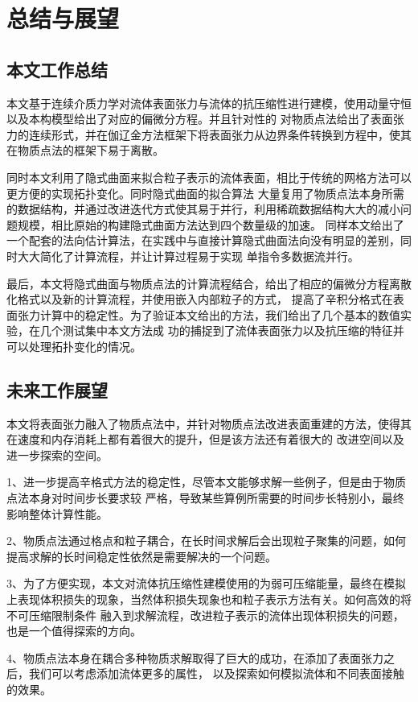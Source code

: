 \chapter{总结与展望}
\section{本文工作总结}
本文基于连续介质力学对流体表面张力与流体的抗压缩性进行建模，使用动量守恒以及本构模型给出了对应的偏微分方程。并且针对性的
对物质点法给出了表面张力的连续形式，并在伽辽金方法框架下将表面张力从边界条件转换到方程中，使其在物质点法的框架下易于离散。

同时本文利用了隐式曲面来拟合粒子表示的流体表面，相比于传统的网格方法可以更方便的实现拓扑变化。同时隐式曲面的拟合算法
大量复用了物质点法本身所需的数据结构，并通过改进迭代方式使其易于并行，利用稀疏数据结构大大的减小问题规模，相比原始的构建隐式曲面方法达到四个数量级的加速。
同样本文给出了一个配套的法向估计算法，在实践中与直接计算隐式曲面法向没有明显的差别，同时大大简化了计算流程，并让计算过程易于实现
单指令多数据流并行。

最后，本文将隐式曲面与物质点法的计算流程结合，给出了相应的偏微分方程离散化格式以及新的计算流程，并使用嵌入内部粒子的方式，
提高了辛积分格式在表面张力计算中的稳定性。为了验证本文给出的方法，我们给出了几个基本的数值实验，在几个测试集中本文方法成
功的捕捉到了流体表面张力以及抗压缩的特征并可以处理拓扑变化的情况。
\section{未来工作展望}
本文将表面张力融入了物质点法中，并针对物质点法改进表面重建的方法，使得其在速度和内存消耗上都有着很大的提升，但是该方法还有着很大的
改进空间以及进一步探索的空间。

1、进一步提高辛格式方法的稳定性，尽管本文能够求解一些例子，但是由于物质点法本身对时间步长要求较
严格，导致某些算例所需要的时间步长特别小，最终影响整体计算性能。

2、物质点法通过格点和粒子耦合，在长时间求解后会出现粒子聚集的问题，如何提高求解的长时间稳定性依然是需要解决的一个问题。

3、为了方便实现，本文对流体抗压缩性建模使用的为弱可压缩能量，最终在模拟上表现体积损失的现象，当然体积损失现象也和粒子表示方法有关。如何高效的将不可压缩限制条件
融入到求解流程，改进粒子表示的流体出现体积损失的问题，也是一个值得探索的方向。

4、物质点法本身在耦合多种物质求解取得了巨大的成功，在添加了表面张力之后，我们可以考虑添加流体更多的属性，
以及探索如何模拟流体和不同表面接触的效果。
